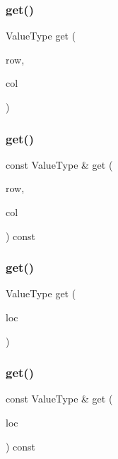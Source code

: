 \mbox{\label{classGrid_a49fcb88bae29483f4cb0858f29f6384e}} 
\subsubsection{\texorpdfstring{get()}{get()}\hspace{0.1cm}{\footnotesize\ttfamily [1/4]}}
{\footnotesize\ttfamily Value\+Type get (\begin{DoxyParamCaption}\item[{int}]{row,  }\item[{int}]{col }\end{DoxyParamCaption})}

\mbox{\label{classGrid_a2b88a9c3e739296050588ad389667146}} 
\subsubsection{\texorpdfstring{get()}{get()}\hspace{0.1cm}{\footnotesize\ttfamily [2/4]}}
{\footnotesize\ttfamily const Value\+Type \& get (\begin{DoxyParamCaption}\item[{int}]{row,  }\item[{int}]{col }\end{DoxyParamCaption}) const}

\mbox{\label{classGrid_a9f9ad65f113e87072ae3b470ba803644}} 
\subsubsection{\texorpdfstring{get()}{get()}\hspace{0.1cm}{\footnotesize\ttfamily [3/4]}}
{\footnotesize\ttfamily Value\+Type get (\begin{DoxyParamCaption}\item[{const \mbox{\hyperlink{structGridLocation}{Grid\+Location}} \&}]{loc }\end{DoxyParamCaption})}

\mbox{\label{classGrid_ad9a359dc416919242abe643f7677f491}} 
\subsubsection{\texorpdfstring{get()}{get()}\hspace{0.1cm}{\footnotesize\ttfamily [4/4]}}
{\footnotesize\ttfamily const Value\+Type \& get (\begin{DoxyParamCaption}\item[{const \mbox{\hyperlink{structGridLocation}{Grid\+Location}} \&}]{loc }\end{DoxyParamCaption}) const}

